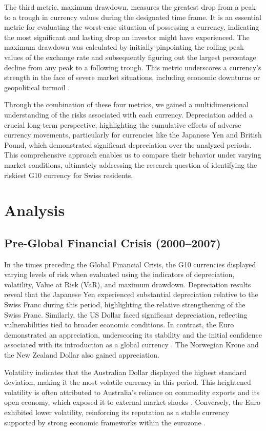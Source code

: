 \documentclass[11pt,a4paper,english,oneside]{book}
\begin{document}
The third metric, maximum drawdown, measures the greatest drop from a peak to a trough in currency values during the designated time frame. It is an essential metric for evaluating the worst-case situation of possessing a currency, indicating the most significant and lasting drop an investor might have experienced. The maximum drawdown was calculated by initially pinpointing the rolling peak values of the exchange rate and subsequently figuring out the largest percentage decline from any peak to a following trough. This metric underscores a currency's strength in the face of severe market situations, including economic downturns or geopolitical turmoil \parencite{stan2014computation}.

Through the combination of these four metrics, we gained a multidimensional understanding of the risks associated with each currency. Depreciation added a crucial long-term perspective, highlighting the cumulative effects of adverse currency movements, particularly for currencies like the Japanese Yen and British Pound, which demonstrated significant depreciation over the analyzed periods. This comprehensive approach enables us to compare their behavior under varying market conditions, ultimately addressing the research question of identifying the riskiest G10 currency for Swiss residents.
\chapter{Analysis}
\section{Pre-Global Financial Crisis (2000–2007)}
In the times preceding the Global Financial Crisis, the G10 currencies displayed varying levels of risk when evaluated using the indicators of depreciation, volatility, Value at Risk (VaR), and maximum drawdown. Depreciation results reveal that the Japanese Yen experienced substantial depreciation relative to the Swiss Franc during this period, highlighting the relative strengthening of the Swiss Franc. Similarly, the US Dollar faced significant depreciation, reflecting vulnerabilities tied to broader economic conditions. In contrast, the Euro demonstrated an appreciation, underscoring its stability and the initial confidence associated with its introduction as a global currency \parencite{EuropeanUnion2024}. The Norwegian Krone and the New Zealand Dollar also gained appreciation.

Volatility indicates that the Australian Dollar displayed the highest standard deviation, making it the most volatile currency in this period. This heightened volatility is often attributed to Australia's reliance on commodity exports and its open economy, which exposed it to external market shocks \parencite{chen2003commodity}. Conversely, the Euro exhibited lower volatility, reinforcing its reputation as a stable currency supported by strong economic frameworks within the eurozone \parencite{juncker2015completing}.
\end{document}
